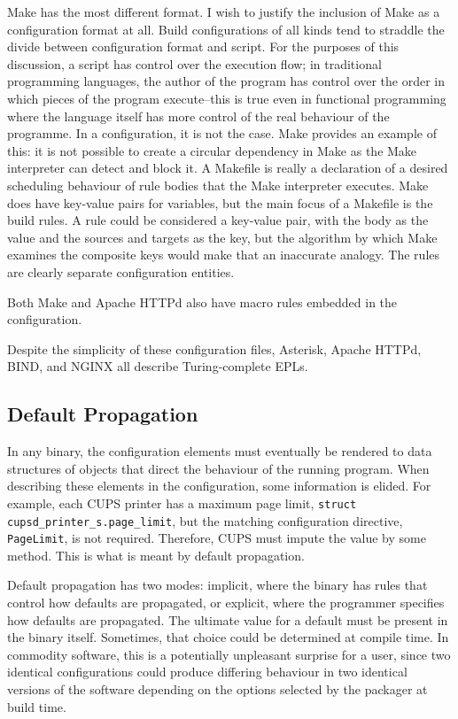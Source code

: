 \documentclass[letterpaper,twocolumn,10pt]{article}
\begin{document}
Make has the most different format. I wish to justify the inclusion of Make as a configuration format at all. Build configurations of all kinds tend to straddle the divide between configuration format and script. For the purposes of this discussion, a script has control over the execution flow; in traditional programming languages, the author of the program has control over the order in which pieces of the program execute--this is true even in functional programming where the language itself has more control of the real behaviour of the programme. In a configuration, it is not the case. Make provides an example of this: it is not possible to create a circular dependency in Make as the Make interpreter can detect and block it. A Makefile is really a declaration of a desired scheduling behaviour of rule bodies that the Make interpreter executes. Make does have key-value pairs for variables, but the main focus of a Makefile is the build rules. A rule could be considered a key-value pair, with the body as the value and the sources and targets as the key, but the algorithm by which Make examines the composite keys would make that an inaccurate analogy. The rules are clearly separate configuration entities.

Both Make and Apache HTTPd also have macro rules embedded in the configuration.

Despite the simplicity of these configuration files, Asterisk, Apache HTTPd, BIND, and NGINX all describe Turing-complete EPLs.

\subsection{Default Propagation}
In any binary, the configuration elements must eventually be rendered to data structures of objects that direct the behaviour of the running program. When describing these elements in the configuration, some information is elided. For example, each CUPS printer has a maximum page limit, \verb!struct cupsd_printer_s.page_limit!, but the matching configuration directive, \verb!PageLimit!, is not required. Therefore, CUPS must impute the value by some method. This is what is meant by default propagation.

Default propagation has two modes: implicit, where the binary has rules that control how defaults are propagated, or explicit, where the programmer specifies how defaults are propagated. The ultimate value for a default must be present in the binary itself. Sometimes, that choice could be determined at compile time. In commodity software, this is a potentially unpleasant surprise for a user, since two identical configurations could produce differing behaviour in two identical versions of the software depending on the options selected by the packager at build time.
\end{document}
